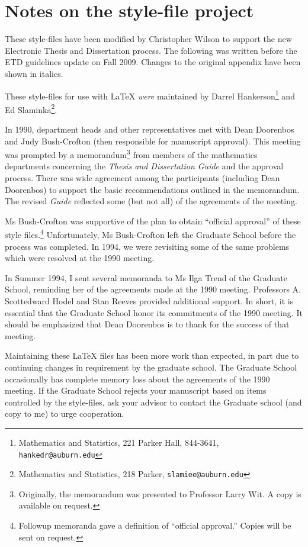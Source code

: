 \documentclass[12pt]{report}
\begin{document}
\chapter{Notes on the style-file project}

\begin{singlespace}
  These style-files have been modified by Christopher Wilson to support the new Electronic Thesis and Dissertation process. The following was written before the ETD guidelines update on Fall 2009. Changes to the original appendix have been shown in italics.

  These style-files for use with \LaTeX{} {\it were} maintained by Darrel
  Hankerson\footnote{Mathematics and Statistics, 221 Parker Hall,
    844-3641, {\tt hankedr@auburn.edu}} and Ed
  Slaminka\footnote{Mathematics and Statistics, 218 Parker,
    {\tt slamiee@auburn.edu}}.

  In 1990, department heads and other representatives met with Dean Doorenbos
  and Judy Bush-Crofton (then responsible for manuscript approval). This
  meeting was prompted by a memorandum\footnote{Originally, the memorandum
    was presented to Professor Larry Wit. A copy is available on request.} from
  members of the mathematics departments concerning the {\em Thesis and
      Dissertation Guide\/} and the approval process. There was wide agreement
  among the participants (including Dean Doorenbos) to support the basic
  recommendations outlined in the memorandum. The revised {\em Guide\/}
  reflected some (but not all) of the agreements of the meeting.

  Ms Bush-Crofton was supportive of the plan to obtain ``official approval''
  of these style files.\footnote{Followup memoranda gave a definition of
    ``official approval.'' Copies will be sent on request.}  Unfortunately, Ms
  Bush-Crofton left the Graduate School before the process was completed. In
  1994, we were revisiting some of the same problems which were
  resolved at the 1990 meeting.

  In Summer 1994, I sent several memoranda to Ms Ilga Trend of the Graduate
  School, reminding her of the agreements made at the 1990 meeting.
  Professors A. Scottedward Hodel and Stan Reeves provided additional
  support.  In short, it is essential that the Graduate School honor its
  commitments of the 1990 meeting. It should be emphasized that Dean
  Doorenbos is to thank for the success of that meeting.

  Maintaining these \LaTeX{} files has been more work than expected, in
  part due to continuing changes in requirement by the graduate school.
  The Graduate School occasionally has complete memory loss about the
  agreements of the 1990 meeting. If the Graduate School rejects your
  manuscript based on items controlled by the style-files, ask
  your advisor to contact the Graduate school (and copy to me) to urge
  cooperation.


\end{singlespace}
\end{document}
